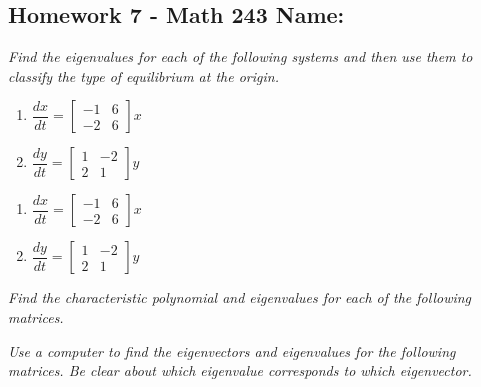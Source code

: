 \documentclass[10pt]{article}
\begin{document}
\pagestyle{empty}
\subsection*{Homework 7 - Math 243 \hfill Name: \underline{\hspace*{2in}}}


\noindent
\textit{Find the eigenvalues for each of the following systems and then use them to classify the type of equilibrium at the origin.} 
\begin{multicols}{2}
\begin{enumerate}
\setcounter{enumi}{\theenumCount}
\item $\dfrac{dx}{dt} =  \begin{bmatrix} -1 & 6 \\ -2 & 6 \end{bmatrix}x$

\item $\dfrac{dy}{dt} = \begin{bmatrix} 1 & -2 \\ 2 & 1 \end{bmatrix}y$
\setcounter{enumCount}{\theenumi}
\end{enumerate} 
\end{multicols}
\vfill

\begin{multicols}{2}
\begin{enumerate}
\setcounter{enumi}{\theenumCount}
\item $\dfrac{dx}{dt} =  \begin{bmatrix} -1 & 6 \\ -2 & 6 \end{bmatrix}x$

\item $\dfrac{dy}{dt} = \begin{bmatrix} 1 & -2 \\ 2 & 1 \end{bmatrix}y$
\setcounter{enumCount}{\theenumi}
\end{enumerate} 
\end{multicols}

\vfill



\newpage
\noindent
\textit{Find the characteristic polynomial and eigenvalues for each of the following matrices.}


\noindent
\textit{Use a computer to find the eigenvectors and eigenvalues for the following matrices. Be clear about which eigenvalue corresponds to which eigenvector.}
\end{document}
